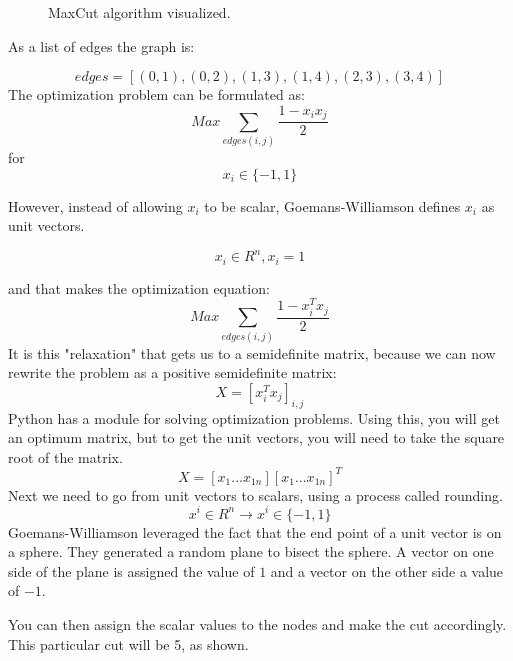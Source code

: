 \begin{figure}[htbp]
    \centering
    \caption{MaxCut algorithm visualized.}
    \label{fig:MaxCut}
\end{figure}

As a list of edges the graph is:

$$ edges = [(0,1),
        (0,2),
        (1,3),
        (1,4),
        (2,3),
        (3,4)] $$
The optimization problem can be formulated as:
$$
Max\sum_{edges(i,j)}{}\frac{1 - x_{i}x_{j}}{2}
$$
for
$$
 x_{i}\in \{ -1,1 \}
$$

However, instead of allowing $x_{i}$ to be scalar, Goemans-Williamson defines $x_{i}$ as unit vectors.

$$
 x_{i}\in R^n, x_{i}=1 
$$

and that makes the optimization equation:
$$
Max\sum_{edges(i,j)}{}\frac{1 - x_{i}^{T}x_{j}}{2}
$$
It is this "relaxation" that gets us to a semidefinite matrix, because we can now rewrite the problem as a positive semidefinite matrix:
$$
X = \left[ x_{i}^{T}x_{j} \right]_{i,j}
$$
Python has a module for solving optimization problems. Using this, you will get an optimum matrix, but to get the unit vectors, you will need to take the square root of the matrix. 
$$
X = \left[ x_{1}...x_{1n} \right]\left[ x_{1}...x_{1n} \right]^{T}
$$
Next we need to go from unit vectors to scalars, using a process called rounding.
$$
x^{i}\in R^n \to x^{i}\in \{ -1,1 \}
$$
Goemans-Williamson leveraged the fact that the end point of a unit vector is on a sphere. They generated a random plane to bisect the sphere. A vector on one side of the plane is assigned the value of $1$ and a vector on the other side a value of $-1$.

You can then assign the scalar values to the nodes and make the cut accordingly. This particular cut will be 5, as shown.


